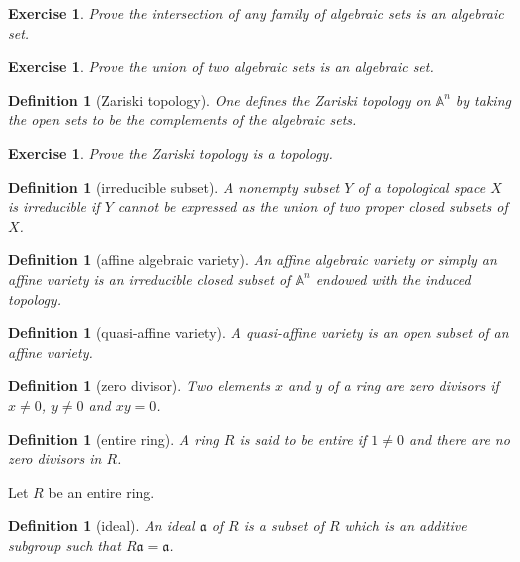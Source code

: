 \documentclass[12pt]{article}
\newtheorem{definition}[proposition]{Definition}
\newtheorem{ex}[proposition]{Exercise}
\begin{document}
\begin{ex}
	Prove the intersection of any family of algebraic sets is an algebraic set.
\end{ex}

\begin{ex}
	Prove the union of two algebraic sets is an algebraic set.
\end{ex}		

\begin{definition}[Zariski topology]
	One defines the Zariski topology on $\mathbb{A}^n$ by taking the open sets to be the complements of the algebraic sets.
\end{definition}

\begin{ex}
	Prove the Zariski topology is a topology. 
\end{ex}

\begin{definition}[irreducible subset]
	A nonempty subset $Y$ of a topological space $X$ is irreducible if $Y$ cannot be expressed as the union of two proper closed subsets of $X$. 
\end{definition}

\begin{definition}[affine algebraic variety]
	An affine algebraic variety or simply an affine variety is an irreducible closed subset of $\mathbb{A}^n$ endowed with the induced topology. 
\end{definition}

\begin{definition}[quasi-affine variety]
	A quasi-affine variety is an open subset of an affine variety. 
\end{definition}

\begin{definition}[zero divisor]
	Two elements $x$ and $y$ of a ring are zero divisors if $x \neq 0$, $y \neq 0$ and $x y = 0$.
\end{definition}

\begin{definition}[entire ring]
	A ring $R$ is said to be entire if $1 \neq 0$ and there are no zero divisors in $R$. 
\end{definition}

Let $R$ be an entire ring. 

\begin{definition}[ideal]
	An ideal $\mathfrak{a}$ of $R$ is a subset of $R$ which is an additive subgroup such that $R\mathfrak{a} = \mathfrak{a}$.
\end{definition}
\end{document}
